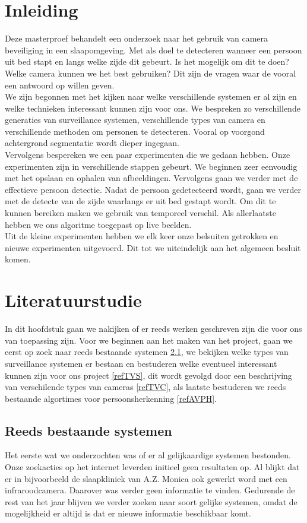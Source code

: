 \chapter{Inleiding}
Deze masterproef behandelt een onderzoek naar het gebruik van camera beveiliging in een slaapomgeving. Met als doel te detecteren wanneer een persoon uit bed stapt en langs welke zijde dit gebeurt. Is het mogelijk om dit te doen? Welke camera kunnen we het best gebruiken? Dit zijn de vragen waar de vooral een antwoord op willen geven. \\
We zijn begonnen met het kijken naar welke verschillende systemen er al zijn en welke technieken interessant kunnen zijn voor ons. We bespreken zo verschillende generaties van surveillance systemen, verschillende types van camera en verschillende methoden om personen te detecteren. Vooral op voorgond achtergrond segmentatie wordt dieper ingegaan. \\
Vervolgens bespereken we een paar experimenten die we gedaan hebben. Onze experimenten zijn in verschillende stappen gebeurt. We beginnen zeer eenvoudig met het opslaan en ophalen van afbeeldingen. Vervolgens gaan we verder met de effectieve persoon detectie. Nadat de persoon gedetecteerd wordt, gaan we verder met de detecte van de zijde waarlangs er uit bed gestapt wordt. Om dit te kunnen bereiken maken we gebruik van temporeel verschil. Als allerlaatste hebben we ons algoritme toegepast op live beelden. \\
Uit de kleine experimenten hebben we elk keer onze belsuiten getrokken en nieuwe experimenten uitgevoerd. Dit tot we uiteindelijk aan het algemeen besluit komen. 

\chapter{Literatuurstudie}
In dit hoofdstuk gaan we nakijken of er reeds werken geschreven zijn die voor ons van toepassing zijn. Voor we beginnen aan het maken van het project, gaan we eerst op zoek naar reeds bestaande systemen \ref{refRBS}, we bekijken welke types van surveillance systemen er bestaan en bestuderen welke eventueel interessant kunnen zijn voor ons project \ref{refTVS}, dit wordt gevolgd door een beschrijving van verschilende types van cameras \ref{refTVC}, als laatste bestuderen we reeds bestaande algortimes voor persoonsherkenning \ref{refAVPH}.

\section{Reeds bestaande systemen}
\label{refRBS}
Het eerste wat we onderzochten was of er al gelijkaardige systemen bestonden. Onze zoekacties op het internet leverden initieel geen resultaten op. Al blijkt dat er in bijvoorbeeld de slaapkliniek van A.Z. Monica ook gewerkt word met een infraroodcamera. Daarover was verder geen informatie te vinden. Gedurende de rest van het jaar blijven we verder zoeken naar soort gelijke systemen, omdat de mogelijkheid er altijd is dat er nieuwe informatie beschikbaar komt.

